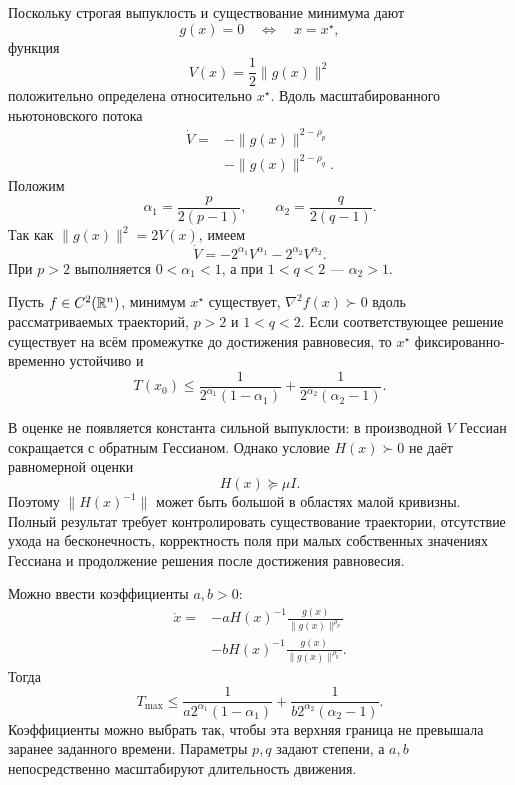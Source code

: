 Поскольку строгая выпуклость и существование минимума дают
\[
    g(x)=0
    \quad\Longleftrightarrow\quad
    x=x^\star,
\]
функция
\[
    V(x)=\frac12\lVert g(x)\rVert^2
\]
положительно определена относительно \(x^\star\). Вдоль
масштабированного ньютоновского потока
\[
\begin{aligned}
    \dot V
    ={}&
    -\lVert g(x)\rVert^{2-\rho_p}
    \\
    &-
    \lVert g(x)\rVert^{2-\rho_q}.
\end{aligned}
\]
Положим
\[
    \alpha_1=\frac{p}{2(p-1)},
    \qquad
    \alpha_2=\frac{q}{2(q-1)}.
\]
Так как \(\lVert g(x)\rVert^2=2V(x)\), имеем
\[
    \dot V
    =
    -2^{\alpha_1}V^{\alpha_1}
    -
    2^{\alpha_2}V^{\alpha_2}.
\]
При \(p>2\) выполняется \(0<\alpha_1<1\), а при
\(1<q<2\) --- \(\alpha_2>1\).

\begin{theorem}
Пусть \(f\in C^2(\mathbb{R}^n)\), минимум \(x^\star\) существует,
\(\nabla^2f(x)\succ0\) вдоль рассматриваемых траекторий,
\(p>2\) и \(1<q<2\). Если соответствующее решение существует на
всём промежутке до достижения равновесия, то
\(x^\star\) фиксированно-временно устойчиво и
\[
    T(x_0)
    \le
    \frac1{2^{\alpha_1}(1-\alpha_1)}
    +
    \frac1{2^{\alpha_2}(\alpha_2-1)}.
\]
\end{theorem}

В оценке не появляется константа сильной выпуклости: в производной
\(V\) Гессиан сокращается с обратным Гессианом. Однако условие
\(H(x)\succ0\) не даёт равномерной оценки
\[
    H(x)\succeq\mu I.
\]
Поэтому \(\lVert H(x)^{-1}\rVert\) может быть большой в областях
малой кривизны. Полный результат требует контролировать существование
траектории, отсутствие ухода на бесконечность, корректность поля при
малых собственных значениях Гессиана и продолжение решения после
достижения равновесия.

Можно ввести коэффициенты \(a,b>0\):
\[
\begin{aligned}
    \dot x
    ={}&
    -aH(x)^{-1}
    \frac{g(x)}{\lVert g(x)\rVert^{\rho_p}}
    \\
    &-
    bH(x)^{-1}
    \frac{g(x)}{\lVert g(x)\rVert^{\rho_q}}.
\end{aligned}
\]
Тогда
\[
    T_{\max}
    \le
    \frac1{a2^{\alpha_1}(1-\alpha_1)}
    +
    \frac1{b2^{\alpha_2}(\alpha_2-1)}.
\]
Коэффициенты можно выбрать так, чтобы эта верхняя граница не
превышала заранее заданного времени. Параметры \(p,q\) задают степени,
а \(a,b\) непосредственно масштабируют длительность движения.

